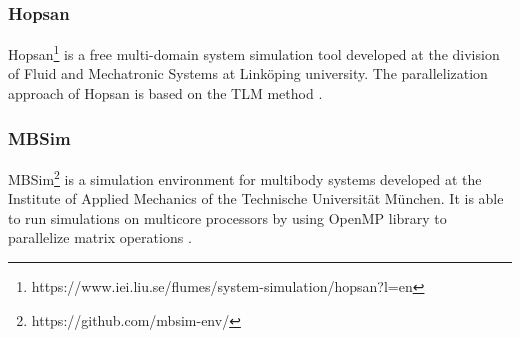 \subsubsection{Hopsan}
Hopsan\footnote{https://www.iei.liu.se/flumes/system-simulation/hopsan?l=en} is a free multi-domain system simulation tool developed at the division of Fluid and Mechatronic Systems at Link\"oping university. The parallelization approach of Hopsan is based on the TLM method \cite{sjolund:2010,braun:2012}.

\subsubsection{MBSim}
MBSim\footnote{https://github.com/mbsim-env/} is a simulation environment for multibody systems developed at the Institute of Applied Mechanics of the Technische Universit\"at M\"unchen. It is able to run simulations on multicore processors by using OpenMP library to parallelize matrix operations \cite{clauberg:2012}.    